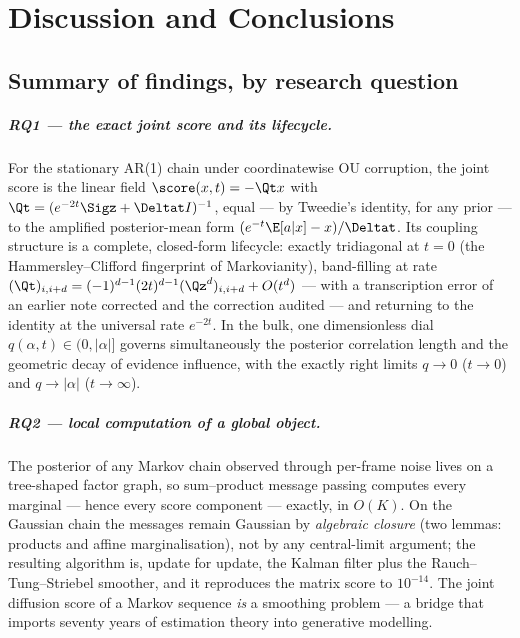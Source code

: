 \chapter{Discussion and Conclusions}\label{ch:conclusions}

\section{Summary of findings, by research question}

\paragraph{RQ1 --- the exact joint score and its lifecycle.} For the
stationary AR(1) chain under coordinatewise OU corruption, the joint score
is the linear field $\score(x,t) = -\Qt x$ with
$\Qt = (e^{-2t}\Sigz + \Deltat I)^{-1}$, equal --- by Tweedie's identity,
for any prior --- to the amplified posterior-mean form
$(e^{-t}\E[a|x] - x)/\Deltat$. Its coupling structure is a complete,
closed-form lifecycle: exactly tridiagonal at $t = 0$ (the
Hammersley--Clifford fingerprint of Markovianity), band-filling at rate
$(\Qt)_{i,i+d} = (-1)^{d-1}(2t)^{d-1}(\Qz^d)_{i,i+d} + O(t^d)$ --- with a
transcription error of an earlier note corrected and the correction
audited --- and returning to the identity at the universal rate $e^{-2t}$.
In the bulk, one dimensionless dial $q(\alpha, t) \in (0, |\alpha|]$
governs simultaneously the posterior correlation length and the geometric
decay of evidence influence, with the exactly right limits $q \to 0$
($t \to 0$) and $q \to |\alpha|$ ($t \to \infty$).

\paragraph{RQ2 --- local computation of a global object.} The posterior of
any Markov chain observed through per-frame noise lives on a tree-shaped
factor graph, so sum--product message passing computes every marginal ---
hence every score component --- exactly, in $O(K)$. On the Gaussian chain
the messages remain Gaussian by \emph{algebraic closure} (two lemmas:
products and affine marginalisation), not by any central-limit argument;
the resulting algorithm is, update for update, the Kalman filter plus the
Rauch--Tung--Striebel smoother, and it reproduces the matrix score to
$10^{-14}$. The joint diffusion score of a Markov sequence \emph{is} a
smoothing problem --- a bridge that imports seventy years of estimation
theory into generative modelling.

